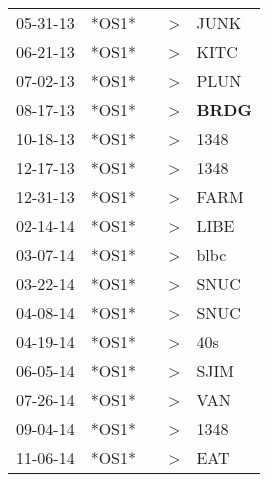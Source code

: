 \begin{supertabular}{p{0.07\textwidth}p{0.06\textwidth}p{0.02\textwidth}p{0.02\textwidth}p{0.06\textwidth}}
 05-31-13\textsuperscript{} &                   *OS1* &    &     \textgreater &           JUNK\textsuperscript{} \\
 06-21-13\textsuperscript{} &                   *OS1* &    &     \textgreater &           KITC\textsuperscript{} \\
 07-02-13\textsuperscript{} &                   *OS1* &    &     \textgreater &           PLUN\textsuperscript{} \\
 08-17-13\textsuperscript{} &                   *OS1* &    &     \textgreater &  \textbf{BRDG\textsuperscript{}} \\
 10-18-13\textsuperscript{} &                   *OS1* &    &     \textgreater &           1348\textsuperscript{} \\
 12-17-13\textsuperscript{} &                   *OS1* &    &     \textgreater &           1348\textsuperscript{} \\
 12-31-13\textsuperscript{} &                   *OS1* &    &     \textgreater &           FARM\textsuperscript{} \\
 02-14-14\textsuperscript{} &                   *OS1* &    &     \textgreater &           LIBE\textsuperscript{} \\
 03-07-14\textsuperscript{} &                   *OS1* &    &     \textgreater &           blbc\textsuperscript{} \\
 03-22-14\textsuperscript{} &                   *OS1* &    &     \textgreater &           SNUC\textsuperscript{} \\
 04-08-14\textsuperscript{} &                   *OS1* &    &     \textgreater &           SNUC\textsuperscript{} \\
 04-19-14\textsuperscript{} &                   *OS1* &    &     \textgreater &            40s\textsuperscript{} \\
 06-05-14\textsuperscript{} &                   *OS1* &    &     \textgreater &           SJIM\textsuperscript{} \\
 07-26-14\textsuperscript{} &                   *OS1* &    &     \textgreater &            VAN\textsuperscript{} \\
 09-04-14\textsuperscript{} &                   *OS1* &    &     \textgreater &           1348\textsuperscript{} \\
 11-06-14\textsuperscript{} &                   *OS1* &    &     \textgreater &            EAT\textsuperscript{} \\

\end{supertabular}
